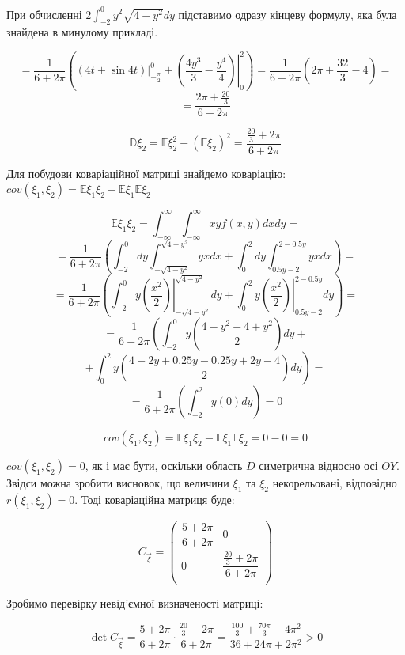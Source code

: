 \documentclass[14pt, a4paper, ukrainian]{extreport}
\begin{document}
	При обчисленні $2\int_{-2}^{0}y^2\sqrt{4-y^2}dy$ підставимо одразу кінцеву формулу, яка була знайдена в минулому прикладі.
	
	$$ = \frac{1}{6 + 2\pi}\left(\left.\left(4t + \sin{4t}\right)\right|_{-\frac{\pi}{2}}^{0} + \left.\left(\frac{4y^3}{3} - \frac{y^4}{4}\right)\right|_0^2 \right) = 
	\frac{1}{6 + 2\pi}\left(2\pi + \frac{32}{3} - 4 \right) = 
	$$
	$$ = \frac{2\pi + \frac{20}{3} }{6 + 2\pi}$$
	
	$$\mathbb{D}\xi_2 = \mathbb{E}\xi_2^2 - (\mathbb{E}\xi_2)^2 = \frac{\frac{20}{3} + 2\pi}{6+2\pi}
	$$	
	
	Для побудови коваріаційної матриці знайдемо коваріацію:\\ $cov(\xi_1, \xi_2) = \mathbb{E}\xi_1\xi_2 - \mathbb{E}\xi_1\mathbb{E}\xi_2$
 		
 	$$\mathbb{E}\xi_1\xi_2 = \int_{-\infty}^{\infty}\int_{-\infty}^{\infty}xyf(x, y)dxdy = $$
 	$$ =  \frac{1}{6+2\pi} \left(\int_{-2}^{0}dy\int_{-\sqrt{4-y^2}}^{\sqrt{4-y^2}}yxdx + \int_{0}^{2}dy\int_{0.5y-2}^{2-0.5y}yxdx\right) = 
 	$$
 	$$ = \frac{1}{6+2\pi} \left(\int_{-2}^{0}y\left.\left(\frac{x^2}{2}\right)\right|_{-\sqrt{4-y^2}}^{\sqrt{4-y^2}}dy+ \int_{0}^{2}y\left.\left(\frac{x^2}{2}\right)\right|_{0.5y-2}^{2-0.5y}dy \right)= 
 	$$
 	$$ = \frac{1}{6+2\pi} \left(\int_{-2}^{0}y\left(\frac{4-y^2 - 4 + y^2}{2}\right)dy \right.+ 
 	$$
 	$$ + \left.\int_{0}^{2}y\left(\frac{4 - 2y + 0.25y - 0.25y + 2y - 4}{2}\right)dy\right) = 
 	$$
 	$$ =\frac{1}{6+2\pi}\left(\int_{-2}^{2}y(0)dy\right) = 0$$
 	
 	$$cov(\xi_1, \xi_2) = \mathbb{E}\xi_1\xi_2 - \mathbb{E}\xi_1\mathbb{E}\xi_2 = 0 - 0 = 0$$
 		
 	$cov(\xi_1, \xi_2) = 0$, як і має бути, оскільки область $D$ симетрична відносно осі $OY$. Звідси можна зробити висновок, що величини $\xi_1$ та $\xi_2$ некорельовані, відповідно $r(\xi_1, \xi_2) = 0$. Тоді коваріаційна матриця буде:
 	
 	$$C_{\vec\xi} = \left(  
 	\begin{matrix}
 		\dfrac{5+2\pi}{6+2\pi} & 0\\
 		0 & \dfrac{\frac{20}{3} + 2\pi}{6 + 2\pi}\\
 	\end{matrix}\right)
 	$$
 	
 	Зробимо перевірку невід'ємної визначеності матриці: 
 	
 	$$\det{C_{\vec\xi}}  = \frac{5 + 2\pi}{6+2\pi} \cdot \frac{\frac{20}{3} + 2\pi}{6+2\pi} = \frac{\frac{100}{3} + \frac{70\pi}{3} + 4\pi^2}{36 + 24\pi + 2\pi^2} > 0$$
 	 	
\end{document}
